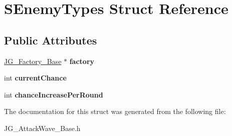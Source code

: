 \hypertarget{struct_s_enemy_types}{\section{S\-Enemy\-Types Struct Reference}
\label{struct_s_enemy_types}
}
\subsection*{Public Attributes}
\begin{DoxyCompactItemize}
\item 
\hypertarget{struct_s_enemy_types_ad8e14661ad8fa467a36f4a0946c0b9b2}{\hyperlink{class_j_g___factory___base}{J\-G\-\_\-\-Factory\-\_\-\-Base} $\ast$ {\bfseries factory}}\label{struct_s_enemy_types_ad8e14661ad8fa467a36f4a0946c0b9b2}

\item 
\hypertarget{struct_s_enemy_types_a44664a0343349fd70e9668d1f25da3af}{int {\bfseries current\-Chance}}\label{struct_s_enemy_types_a44664a0343349fd70e9668d1f25da3af}

\item 
\hypertarget{struct_s_enemy_types_a3f0dbd0095863f5c07389eef2f48eb5e}{int {\bfseries chance\-Increase\-Per\-Round}}\label{struct_s_enemy_types_a3f0dbd0095863f5c07389eef2f48eb5e}

\end{DoxyCompactItemize}


The documentation for this struct was generated from the following file\-:\begin{DoxyCompactItemize}
\item 
J\-G\-\_\-\-Attack\-Wave\-\_\-\-Base.\-h\end{DoxyCompactItemize}
